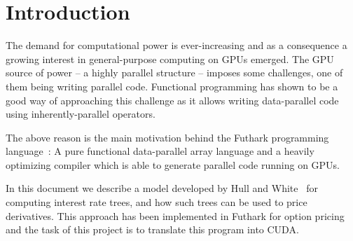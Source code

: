 \section{Introduction}

The demand for computational power is ever-increasing and as
a consequence a growing interest in general-purpose
computing on GPUs emerged. The GPU source of power -- a
highly parallel structure -- imposes some challenges, one of
them being writing parallel code. Functional programming has
shown to be a good way of approaching this challenge as it
allows writing data-parallel code using inherently-parallel
operators.

The above reason is the main motivation behind the Futhark
programming language~\cite{futharkweb}: A pure functional
data-parallel array language and a heavily optimizing
compiler which is able to generate parallel code running on
GPUs.

In this document we describe a model developed by Hull and
White~\cite{HullWhite94} for computing interest rate trees,
and how such trees can be used to price derivatives. This
approach has been implemented in Futhark for option pricing
and the task of this project is to translate this program
into CUDA.

